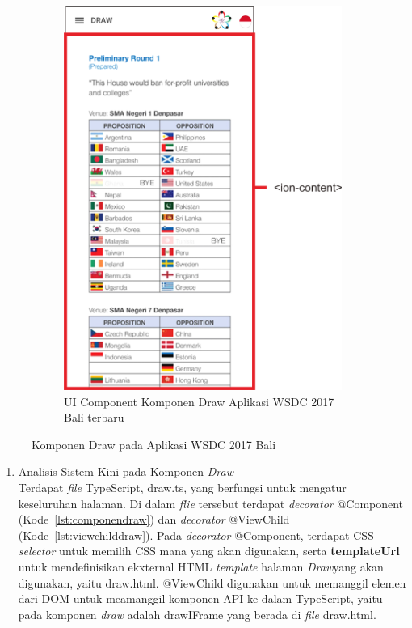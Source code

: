 \begin{enumerate}
\begin{figure}[H]
     	\hspace*{0.5in}
     	\begin{subfigure}[b]{0.43\textwidth}
         	\centering
         	\includegraphics[scale=0.4]{Gambar/DrawPageKini.png}
         	\caption{UI Component Komponen Draw Aplikasi WSDC 2017 Bali terbaru}
         	\label{fig:DrawPageKini}
     	\end{subfigure}
        \caption{Komponen Draw pada Aplikasi WSDC 2017 Bali}
        \label{fig:UIComponent1}
	\end{figure}
	\begin{enumerate}
		\item Analisis Sistem Kini pada Komponen \textit{Draw} \\
		Terdapat \textit{file} TypeScript, draw.ts, yang berfungsi untuk mengatur keseluruhan halaman. Di dalam \textit{flie} tersebut terdapat \textit{decorator} @Component (Kode~\ref{lst:componendraw}) dan \textit{decorator} @ViewChild (Kode~\ref{lst:viewchilddraw}). Pada \textit{decorator} @Component, terdapat CSS \textit{selector} untuk memilih CSS mana yang akan digunakan, serta \textbf{templateUrl} untuk mendefinisikan ekxternal HTML \textit{template} halaman \textit{Draw}yang akan digunakan, yaitu draw.html. @ViewChild digunakan untuk memanggil elemen dari DOM untuk meamanggil komponen API ke dalam TypeScript, yaitu pada komponen \textit{draw} adalah drawIFrame yang berada di \textit{file} draw.html.

\end{enumerate}
\end{enumerate}
